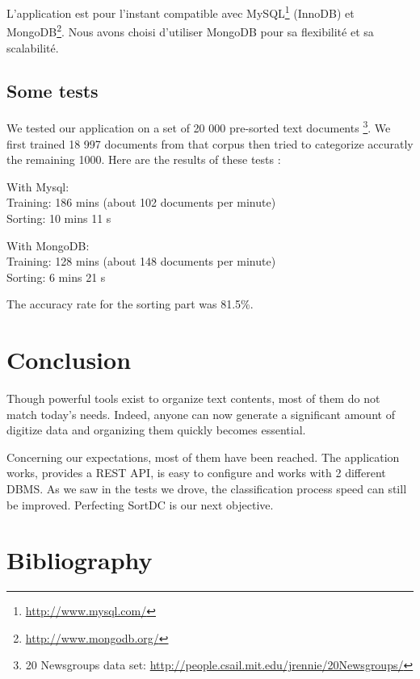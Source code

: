 \documentclass[a4paper,11pt]{article}
\begin{document}
L'application est pour l'instant compatible avec MySQL\footnote{\url{http://www.mysql.com/}}
(InnoDB) et MongoDB\footnote{\url{http://www.mongodb.org/}}. Nous avons choisi
d'utiliser MongoDB pour sa flexibilité et sa scalabilité.

\subsection{Some tests}
    
We tested our application on a set of 20 000 pre-sorted text documents
\footnote{20 Newsgroups data set: \url{http://people.csail.mit.edu/jrennie/20Newsgroups/}}.
We first trained 18 997 documents from that corpus then tried to categorize
accuratly the remaining 1000. Here are the results of these tests :

With Mysql:\\
Training: 186 mins (about 102 documents per minute)\\
Sorting: 10 mins 11 s

With MongoDB:\\
Training: 128 mins (about 148 documents per minute)\\
Sorting: 6 mins 21 s

The accuracy rate for the sorting part was 81.5\%.


\section*{Conclusion}

Though powerful tools exist to organize text contents, most of them do not
match today's needs. Indeed, anyone can now generate a significant amount
of digitize data and organizing them quickly becomes essential.

Concerning our expectations, most of them have been reached. The application
works, provides a REST API, is easy to configure and works with 2 different
DBMS. As we saw in the tests we drove, the classification process speed can
still be improved. Perfecting SortDC is our next objective.




\clearpage
\section*{Bibliography}
\end{document}
